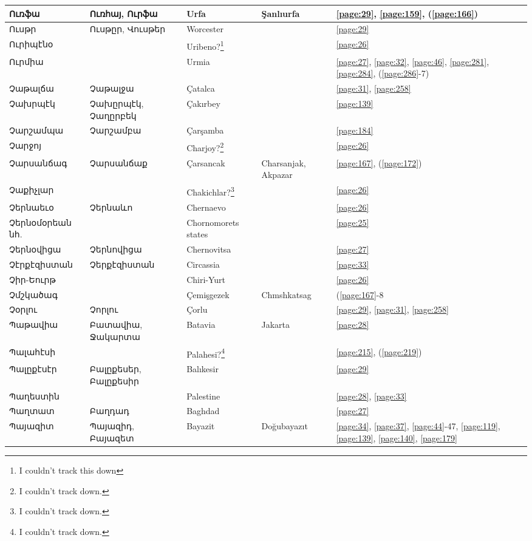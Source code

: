 \begin{center}
\begin{longtable}{|p{}|p{3cm}|p{3cm}|p{2cm}|p{3cm}|}
Ուռֆա&   Ուռհայ, Ուրֆա & Urfa&Şanlıurfa &\ref{page:29}, \ref{page:159}, (\ref{page:166})\\ \hline
Ուսթր& Ուսթըր, Վուսթեր &Worcester & &\ref{page:29}\\ \hline
Ուրիպէնօ& &Uribeno?\footnote{I couldn't track this down} & &\ref{page:26}\\ \hline
Ուրմիա& &Urmia & &\ref{page:27}, \ref{page:32}, \ref{page:46}, \ref{page:281}, \ref{page:284}, (\ref{page:286}-7)\\ \hline
Չաթալճա&  Չաթալջա  &Çatalca & &\ref{page:31}, \ref{page:258}\\ \hline
Չախրպէկ&Չախըրպէկ, Չաղըրբեկ & Çakırbey& &\ref{page:139}\\ \hline
Չարշամպա&Չարշամբա &Çarşamba & &\ref{page:184}\\ \hline
Չարջոյ& & Charjoy?\footnote{I couldn't track down.}& &\ref{page:26}\\ \hline
Չարսանճագ& Չարսանճաք&Çarsancak &Charsanjak, Akpazar &\ref{page:167}, (\ref{page:172})\\ \hline
Չաքիչլար& &Chakichlar?\footnote{I couldn't track down. } & &\ref{page:26}\\ \hline
Չերնաեւօ&Չերնաևո & Chernaevo& &\ref{page:26}\\ \hline
Չերնօմօրեան նհ.& &Chornomorets states & &\ref{page:25}\\ \hline
Չերնօվիցա&Չերնովիցա & Chernovitsa& &\ref{page:27}\\ \hline
Չէրքէզիստան&Չերքէզիստան& Circassia& &\ref{page:33}\\ \hline
Չիր-Եուրթ&& Chiri-Yurt&  &\ref{page:26}\\ \hline
Չմշկածագ& & Çemişgezek &   Chmshkatsag  &(\ref{page:167}-8\\ \hline
Չօրլու& Չորլու&Çorlu & &\ref{page:29}, \ref{page:31}, \ref{page:258}\\ \hline
Պաթավիա& Բատավիա, Ջակարտա&  Batavia&Jakarta &\ref{page:28}\\ \hline
Պալահէսի& &Palahesi?\footnote{I couldn't track down.} & &\ref{page:215}, (\ref{page:219})\\ \hline
Պալըքէսէր&  Բալըքեսեր, Բալըքեսիր&Balıkesir & &\ref{page:29}\\ \hline
Պաղեստին& &Palestine & &\ref{page:28}, \ref{page:33}\\ \hline
Պաղտատ& Բաղդադ&Baghdad & &\ref{page:27}\\ \hline
Պայազիտ&Պայազիդ, Բայազետ &  Bayazit  & Doğubayazıt &\ref{page:34}, \ref{page:37}, \ref{page:44}-47, \ref{page:119}, \ref{page:139}, \ref{page:140}, \ref{page:179}\\ \hline

\end{longtable}
\end{center}
